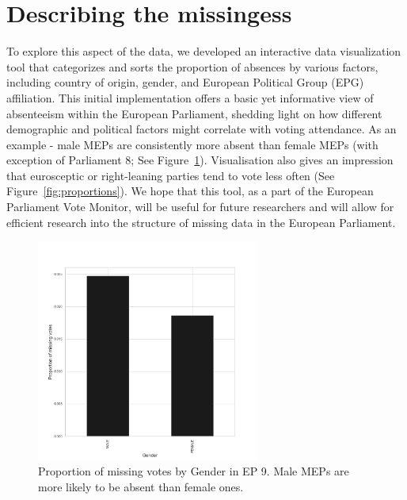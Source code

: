 \documentclass[a4paper,12pt]{report}
\begin{document}
        \section{Describing the missingess}\label{sec:describing-the-missingess}
            To explore this aspect of the data, we developed an interactive data visualization
            tool that categorizes and sorts the proportion of absences by various factors, including country of
            origin, gender,
            and European Political Group (EPG) affiliation. This initial implementation offers a basic yet
            informative view of
            absenteeism within the European Parliament, shedding light on how different demographic and political
            factors might
            correlate with voting attendance. As an example - male MEPs are consistently more absent than female
            MEPs (with
            exception of Parliament 8; See Figure~\ref{fig:gender}).
            Visualisation also gives an impression that eurosceptic
            or right-leaning parties tend to vote less often (See Figure~\ref{fig:proportions}).
            We hope that this tool, as a part of the European Parliament Vote Monitor, will be useful for future
            researchers and will allow for efficient research into the structure of missing data in the European
            Parliament.
\begin{figure}[htb]
                \centering
                \includegraphics[width=0.65\textwidth]{Graphs/genderreport}
                \caption
                {Proportion of missing votes by Gender in EP 9. Male MEPs are more likely to be absent than female
                ones.}
                \label{fig:gender}
            \end{figure}
\end{document}
